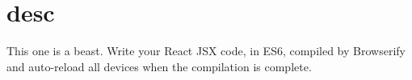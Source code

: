 \chapter{desc}
\hypertarget{md__d_1_2_g_i_t_2_food_link_2foodlink_8client_2node__modules_2bs-recipes_2recipes_2gulp_8browserify_2desc}{}\label{md__d_1_2_g_i_t_2_food_link_2foodlink_8client_2node__modules_2bs-recipes_2recipes_2gulp_8browserify_2desc}
This one is a beast. Write your React JSX code, in ES6, compiled by Browserify and auto-\/reload all devices when the compilation is complete. 